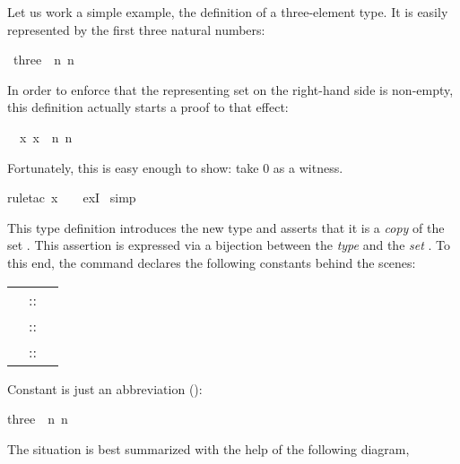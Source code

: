 \begin{isabellebody}
\begin{isamarkuptext}
Let us work a simple example, the definition of a three-element type.
It is easily represented by the first three natural numbers:%
\end{isamarkuptext}%
\ three\ {\isacharequal}\ {\isachardoublequote}{\isacharbraceleft}n{\isachardot}\ n\ {\isasymle}\ {}{\isacharbraceright}{\isachardoublequote}%
\begin{isamarkuptxt}%
\noindent{}%
In order to enforce that the representing set on the right-hand side is
non-empty, this definition actually starts a proof to that effect:
\begin{isabelle}%
\ {}{\isachardot}\ {\isasymexists}x{\isachardot}\ x\ {\isasymin}\ {\isacharbraceleft}n{\isachardot}\ n\ {\isasymle}\ {}{\isacharbraceright}%
\end{isabelle}
Fortunately, this is easy enough to show: take 0 as a witness.%
\end{isamarkuptxt}%
rule{\isacharunderscore}tac\ x\ {\isacharequal}\ {}\ \ exI{\isacharparenright}\isanewline
{}\ simp%
\begin{isamarkuptext}%
This type definition introduces the new type  and asserts
that it is a \emph{copy} of the set . This assertion
is expressed via a bijection between the \emph{type}  and the
\emph{set} . To this end, the command declares the following
constants behind the scenes:
\begin{center}
\begin{tabular}{rcl}
\isa{three} &::& \isa{nat\ set} \\
\isa{Rep{\isacharunderscore}three} &::& \isa{three\ {\isasymRightarrow}\ nat}\\
\isa{Abs{\isacharunderscore}three} &::& \isa{nat\ {\isasymRightarrow}\ three}
\end{tabular}
\end{center}
Constant  is just an abbreviation ():
\begin{isabelle}%
three\ {\isasymequiv}\ {\isacharbraceleft}n{\isachardot}\ n\ {\isasymle}\ {}{\isacharbraceright}%
\end{isabelle}
The situation is best summarized with the help of the following diagram,

\end{isamarkuptext}
\end{isabellebody}
